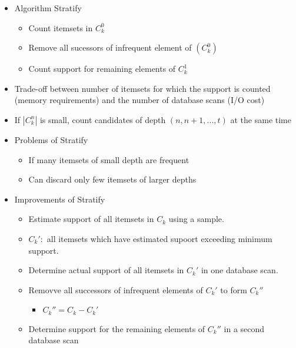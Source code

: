 \documentclass[../notes.tex]{subfiles}
\begin{document}
\begin{itemize}
  \newpage

  \item Algorithm Stratify
  \begin{itemize}
    \item Count itemsets in $C_k^0$
    \item Remove all sucessors of infrequent element of $(C_k^0)$
    \item Count support for remaining elements of $C_k^1$
  \end{itemize}
  \item Trade-off between number of itemsets for which the support is counted (memory requirements) and the number of database scans (I/O cost)
  \item If $|C_k^n|$ is small, count candidates of depth $(n, n+1, ..., t)$ at the same time

  \item Problems of Stratify
  \begin{itemize}
    \item If many itemsets of small depth are frequent
    \item Can discard only few itemsets of larger depths
  \end{itemize}

  \item Improvements of Stratify
  \begin{itemize}
    \item Estimate support of all itemsets in $C_k$ using a sample.
    \item $C_k':$ all itemsets which have estimated supoort exceeding minimum support.
    \item Determine actual support of all itemsets in $C_k'$ in one database scan.
    \item Removve all successors of infrequent elements of $C_k'$ to form $C_k''$
    \begin{itemize} 
      \item $C_k'' = C_k - C_k'$
    \end{itemize}
    \item Determine support for the remaining elements of $C_k''$ in a second database scan
  \end{itemize}
\end{itemize}
\end{document}
